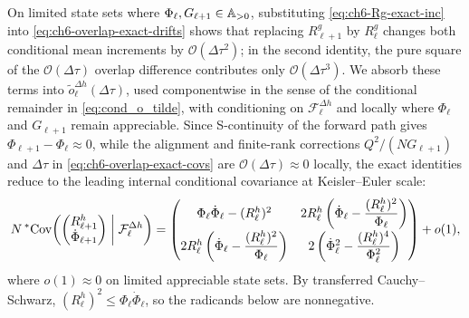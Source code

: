 On limited state sets where $\Phi_\ell, G_{\ell+1} \in \mathbb{A}_{>0}$, substituting \eqref{eq:ch6-Rg-exact-inc} into \eqref{eq:ch6-overlap-exact-drifts} shows that replacing $R_{\ell+1}^g$ by $R_\ell^g$ changes both conditional mean increments by $\mathcal{O}(\Delta\tau^2)$; in the second identity, the pure square of the $\mathcal{O}(\Delta\tau)$ overlap difference contributes only $\mathcal{O}(\Delta\tau^3)$. We absorb these terms into $\tilde{o}_\ell^{\Delta h}(\Delta\tau)$, used componentwise in the sense of the conditional remainder in \eqref{eq:cond_o_tilde},
with conditioning on $\mathcal{F}_\ell^{\Delta h}$ and locally where $\Phi_\ell$ and $G_{\ell+1}$ remain appreciable. Since S-continuity of the forward path gives $\Phi_{\ell+1} - \Phi_\ell \approx 0$, while the alignment and finite-rank corrections $Q^2/(N G_{\ell+1})$ and $\Delta\tau$ in \eqref{eq:ch6-overlap-exact-covs} are $\mathcal{O}(\Delta\tau) \approx 0$ locally, the exact identities reduce to the leading internal conditional covariance at Keisler--Euler scale:
\begin{equation}
\label{eq:ch6-overlap-leading-cov}
N\,{}^*\!\operatorname{Cov}\!\left(\begin{pmatrix} R_{\ell+1}^h \\ \dot{\Phi}_{\ell+1} \end{pmatrix} \;\middle|\; \mathcal{F}_\ell^{\Delta h}\right)
=
\begin{pmatrix}
  \Phi_\ell \dot{\Phi}_\ell - (R_\ell^h)^2 &
  2 R_\ell^h \left(\dot{\Phi}_\ell - \dfrac{(R_\ell^h)^2}{\Phi_\ell}\right) \\[0.7em]
  2 R_\ell^h \left(\dot{\Phi}_\ell - \dfrac{(R_\ell^h)^2}{\Phi_\ell}\right) &
  2\left(\dot{\Phi}_\ell^2 - \dfrac{(R_\ell^h)^4}{\Phi_\ell^2}\right)
\end{pmatrix}
+ o(1),
\end{equation}
where $o(1) \approx 0$ on limited appreciable state sets. By transferred Cauchy--Schwarz, $(R_\ell^h)^2 \le \Phi_\ell \dot{\Phi}_\ell$, so the radicands below are nonnegative.

